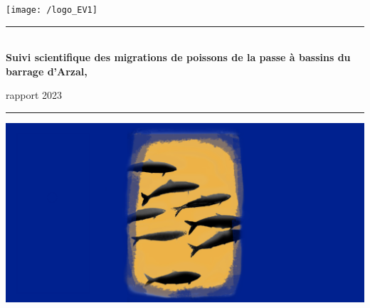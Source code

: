 \documentclass[11pt,twocolumn,titlepage,twoside]{article}\usepackage[]{graphicx}\usepackage[]{color}
\begin{document}
\newpage
{}
\thispagestyle{empty}
\pagecolor{bleu_EV}
\begin{minipage}{\textwidth}
\vspace{30pt}
\hspace{30pt}
\texttt{[image: /logo\_EV1]}
\end{minipage}

\begin{minipage}{0.1\textwidth}
\phantom{This text will be invisible}
\end{minipage}
\begin{minipage}{0.8\textwidth}
\begin{center}
\noindent
{\color{turquoise_EV}\rule{\textwidth}{2.5pt}}\\
\vspace{8mm}
\color{white}
{ \titlefont \huge  \bfseries{Suivi scientifique des migrations de poissons 
    de la passe à bassins du barrage d'Arzal,\\
    }}
\bigskip
{\titlefont  \LARGE rapport 2023\par }
\vspace{4mm}\noindent
{\color{turquoise_EV}\rule{0.9\textwidth}{1.8pt}}\par
\vspace{5mm}
{}
\end{center}
\end{minipage}



\vspace{2cm}
\includegraphics[width=\paperwidth]{ala.png}

\vspace{2cm}
\begin{minipage}{0.8\textwidth}
\begin{center}
\end{center}
\end{minipage}
\restoregeometry
\clearpage
\normalsize
\pagecolor{white}
\end{document}
